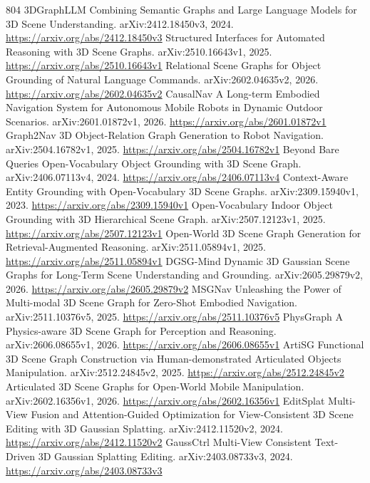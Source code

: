 \documentclass[11pt]{article}
\begin{document}
\begin{thebibliography}{804}
 3DGraphLLM Combining Semantic Graphs and Large Language Models for 3D Scene Understanding. arXiv:2412.18450v3, 2024. \url{https://arxiv.org/abs/2412.18450v3}
 Structured Interfaces for Automated Reasoning with 3D Scene Graphs. arXiv:2510.16643v1, 2025. \url{https://arxiv.org/abs/2510.16643v1}
 Relational Scene Graphs for Object Grounding of Natural Language Commands. arXiv:2602.04635v2, 2026. \url{https://arxiv.org/abs/2602.04635v2}
 CausalNav A Long-term Embodied Navigation System for Autonomous Mobile Robots in Dynamic Outdoor Scenarios. arXiv:2601.01872v1, 2026. \url{https://arxiv.org/abs/2601.01872v1}
 Graph2Nav 3D Object-Relation Graph Generation to Robot Navigation. arXiv:2504.16782v1, 2025. \url{https://arxiv.org/abs/2504.16782v1}
 Beyond Bare Queries Open-Vocabulary Object Grounding with 3D Scene Graph. arXiv:2406.07113v4, 2024. \url{https://arxiv.org/abs/2406.07113v4}
 Context-Aware Entity Grounding with Open-Vocabulary 3D Scene Graphs. arXiv:2309.15940v1, 2023. \url{https://arxiv.org/abs/2309.15940v1}
 Open-Vocabulary Indoor Object Grounding with 3D Hierarchical Scene Graph. arXiv:2507.12123v1, 2025. \url{https://arxiv.org/abs/2507.12123v1}
 Open-World 3D Scene Graph Generation for Retrieval-Augmented Reasoning. arXiv:2511.05894v1, 2025. \url{https://arxiv.org/abs/2511.05894v1}
 DGSG-Mind Dynamic 3D Gaussian Scene Graphs for Long-Term Scene Understanding and Grounding. arXiv:2605.29879v2, 2026. \url{https://arxiv.org/abs/2605.29879v2}
 MSGNav Unleashing the Power of Multi-modal 3D Scene Graph for Zero-Shot Embodied Navigation. arXiv:2511.10376v5, 2025. \url{https://arxiv.org/abs/2511.10376v5}
 PhysGraph A Physics-aware 3D Scene Graph for Perception and Reasoning. arXiv:2606.08655v1, 2026. \url{https://arxiv.org/abs/2606.08655v1}
 ArtiSG Functional 3D Scene Graph Construction via Human-demonstrated Articulated Objects Manipulation. arXiv:2512.24845v2, 2025. \url{https://arxiv.org/abs/2512.24845v2}
 Articulated 3D Scene Graphs for Open-World Mobile Manipulation. arXiv:2602.16356v1, 2026. \url{https://arxiv.org/abs/2602.16356v1}
 EditSplat Multi-View Fusion and Attention-Guided Optimization for View-Consistent 3D Scene Editing with 3D Gaussian Splatting. arXiv:2412.11520v2, 2024. \url{https://arxiv.org/abs/2412.11520v2}
 GaussCtrl Multi-View Consistent Text-Driven 3D Gaussian Splatting Editing. arXiv:2403.08733v3, 2024. \url{https://arxiv.org/abs/2403.08733v3}

\end{thebibliography}
\end{document}
